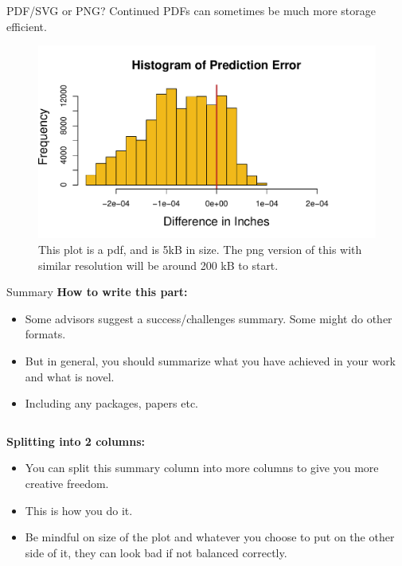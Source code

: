 \documentclass[final]{beamer}
\newlength{\colwidth}
\begin{document}
\begin{frame}[t]
\begin{columns}[t]
\begin{column}{\colwidth}
\begin{block}{PDF/SVG or PNG? Continued}
PDFs can sometimes be much more storage efficient. 
\begin{figure}[h]
	\centering
	\includegraphics[width=0.9\linewidth]{Images/RainfallPredictionComparison_PosterVer_B.pdf}
	\caption{This plot is a pdf, and is 5kB in size.  The png version of this with similar resolution will be around 200 kB to start. }
	\label{fig:Histogram}
\end{figure} 

\end{block}

\begin{block}{Summary}
\textbf{How to write this part:}
	\begin{itemize}
		\item[\textcolor{blasterBlue}{\bullet}] Some advisors suggest a success/challenges summary. Some might do other formats. 		
		\item[\textcolor{blasterBlue}{\bullet}] But in general, you should summarize what you have achieved in your work and what is novel. 
		\item[\textcolor{blasterBlue}{\bullet}] Including any packages, papers etc. 
	\end{itemize}
\vspace{0.5cm}
\begin{columns}
 	\begin{column}{0.73\textwidth}
	\textbf{Splitting into 2 columns:}
\begin{itemize}
	\item[\textcolor{blasterBlue}{\bullet}] You can split this summary column into more columns to give you more creative freedom. 
	\item[\textcolor{blasterBlue}{\bullet}] This is how you do it. 
	\item[\textcolor{blasterBlue}{\bullet}] Be mindful on size of the plot and whatever you choose to put on the other side of it, they can look bad if not balanced correctly. 
	\end{itemize}
	\end{column}
	

\end{columns}
\end{block}
\end{column}
\end{columns}
\end{frame}
\end{document}
